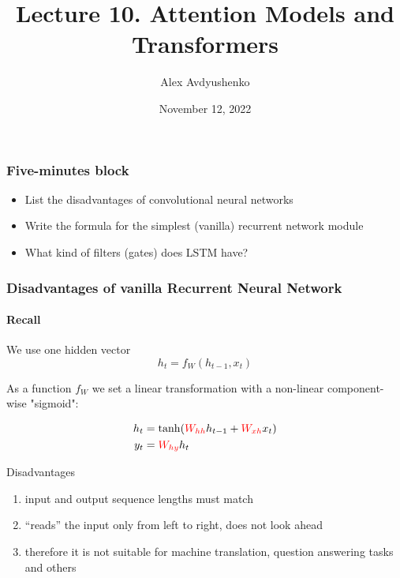 \documentclass[fullscreen=true, bookmarks=true, hyperref={pdfencoding=unicode}]{beamer}
\title{Lecture 10. Attention Models and Transformers}
\author{Alex Avdyushenko}
\institute{Kazakh-British Technical University}
\date{November 12, 2022}
\begin{document}

\begin{frame}
\transdissolve[duration=0.2]
\titlepage
\end{frame}


\begin{frame}
  \frametitle{Five-minutes block}
  \pause
  \begin{itemize}
     \item List the disadvantages of convolutional neural networks
     \item Write the formula for the simplest (vanilla) recurrent network module
     \item What kind of filters (gates) does LSTM have?
  \end{itemize}
\end{frame}


\begin{frame}[t]
  \frametitle{Disadvantages of vanilla Recurrent Neural Network}
  \framesubtitle{Recall}

  We use one hidden vector
  $$ h_t = f_W(h_{t-1}, x_t)$$

  As a function $f_W$ we set a linear transformation with a non-linear component-wise "sigmoid":

  \begin{align*}
    h_t &= \tanh ({\color{red}W_{hh}} h_{t-1} + {\color{red}W_{xh}} x_t) \\
    y_t &= {\color{red}W_{hy}} h_t
  \end{align*}

  \pause
  Disadvantages
   \begin{enumerate}
     \item input and output sequence lengths must match
     \item ``reads'' the input only from left to right, does not look ahead
     \item therefore it is not suitable for machine translation, question answering tasks and others
   \end{enumerate}

\end{frame}
\end{document}
